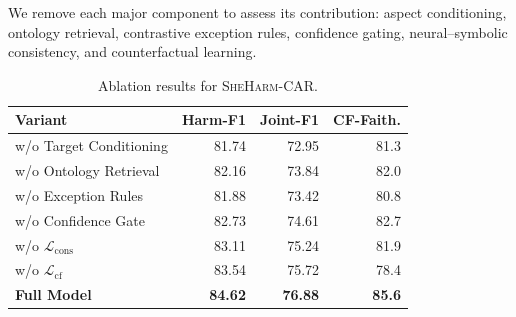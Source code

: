 \documentclass[11pt]{article}
\begin{document}
We remove each major component to assess its contribution:
aspect conditioning, ontology retrieval, contrastive exception rules,
confidence gating, neural--symbolic consistency, and counterfactual
learning.
\begin{table}[t]
\centering
\small
\setlength{\tabcolsep}{2.8pt}
\renewcommand{\arraystretch}{1.05}
\begin{tabular}{lrrr}
\toprule
\textbf{Variant} &
\textbf{Harm-F1} &
\textbf{Joint-F1} &
\textbf{CF-Faith.} \\
\midrule
w/o Target Conditioning
& 81.74 & 72.95 & 81.3 \\

w/o Ontology Retrieval
& 82.16 & 73.84 & 82.0 \\

w/o Exception Rules
& 81.88 & 73.42 & 80.8 \\

w/o Confidence Gate
& 82.73 & 74.61 & 82.7 \\

w/o $\mathcal{L}_{\mathrm{cons}}$
& 83.11 & 75.24 & 81.9 \\

w/o $\mathcal{L}_{\mathrm{cf}}$
& 83.54 & 75.72 & 78.4 \\
\midrule
\textbf{Full Model}
& \textbf{84.62}
& \textbf{76.88}
& \textbf{85.6} \\
\bottomrule
\end{tabular}
\caption{Ablation results for \textsc{SheHarm-CAR}.}
\label{tab:ablation}
\end{table}
\end{document}
